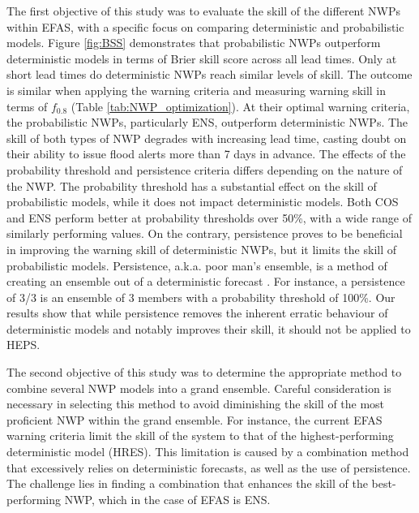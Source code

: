 \documentclass{ametsocV6.1}
\begin{document}
The first objective of this study was to evaluate the skill of the different NWPs within EFAS, with a specific focus on comparing deterministic and probabilistic models. Figure \ref{fig:BSS} demonstrates that probabilistic NWPs outperform deterministic models in terms of Brier skill score across all lead times. Only at short lead times do deterministic NWPs reach similar levels of skill. The outcome is similar when applying the warning criteria and measuring warning skill in terms of $f_{0.8}$ (Table \ref{tab:NWP_optimization}). At their optimal warning criteria, the probabilistic NWPs, particularly ENS, outperform deterministic NWPs. The skill of both types of NWP degrades with increasing lead time, casting doubt on their ability to issue flood alerts more than 7 days in advance. The effects of the probability threshold and persistence criteria differs depending on the nature of the NWP. The probability threshold has a substantial effect on the skill of probabilistic models, while it does not impact deterministic models. Both COS and ENS perform better at probability thresholds over 50\%, with a wide range of similarly performing values. On the contrary, persistence proves to be beneficial in improving the warning skill of deterministic NWPs, but it limits the skill of probabilistic models. Persistence, a.k.a. poor man's ensemble, is a method of creating an ensemble out of a deterministic forecast \citep{Cloke2009}. For instance, a persistence of 3/3 is an ensemble of 3 members with a probability threshold of 100\%. Our results show that while persistence removes the inherent erratic behaviour of deterministic models and notably improves their skill, it should not be applied to HEPS. 

The second objective of this study was to determine the appropriate method to combine several NWP models into a grand ensemble. Careful consideration is necessary in selecting this method to avoid diminishing the skill of the most proficient NWP within the grand ensemble. For instance, the current EFAS warning criteria limit the skill of the system to that of the highest-performing deterministic model (HRES). This limitation is caused by a combination method that excessively relies on deterministic forecasts, as well as the use of persistence. The challenge lies in finding a combination that enhances the skill of the best-performing NWP, which in the case of EFAS is ENS.
\end{document}
